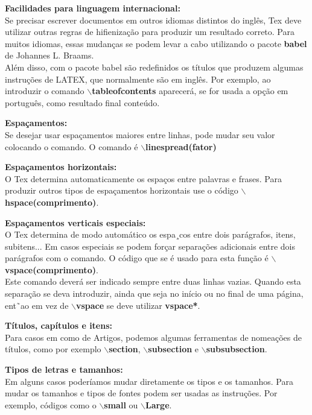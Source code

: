 \documentclass[a4paper, 12pt]{article}
\begin{document}
\begin{flushleft}
\textbf{Facilidades para linguagem internacional:}
\\
Se precisar escrever documentos em outros idiomas distintos do inglês, Tex deve utilizar outras regras de hifienização para produzir um resultado correto. Para muitos idiomas, essas mudanças se podem levar a cabo utilizando o pacote \textbf{babel} de Johannes L. Braams. 
\\
Além disso, com o pacote babel são redefinidos os títulos que produzem algumas instruções de LATEX, que normalmente são em inglês. Por exemplo, ao introduzir o comando \textbf{$\backslash$tableofcontents} aparecerá, se for usada a opção em português, como resultado final conteúdo. \singlespacing

\textbf{Espaçamentos:}
\\
Se desejar usar espaçamentos maiores entre linhas, pode mudar seu valor colocando o comando. O comando é \textbf{$\backslash$linespread(fator)} \singlespacing

\textbf{Espaçamentos horizontais:}
\\
O Tex determina automaticamente os espaços entre palavras e frases. Para produzir outros tipos de espaçamentos horizontais use o código \textbf{$\backslash$hspace(comprimento)}. \singlespacing

\textbf{Espaçamentos verticais especiais:}
\\
O Tex determina de modo automático os espa¸cos entre dois parágrafos, itens, subitens... Em casos especiais se podem forçar separações adicionais entre dois parágrafos com o comando. O código que se é usado para esta função é \textbf{$\backslash$vspace(comprimento)}.
\\
Este comando deverá ser indicado sempre entre duas linhas vazias. Quando esta separação se deva introduzir, ainda que seja no início ou no final de uma página, ent˜ao em vez de \textbf{$\backslash$vspace} se deve utilizar \textbf{vspace*}. \singlespacing

\textbf{Títulos, capítulos e itens:}
\\
Para casos em como de Artigos, podemos algumas ferramentas de nomeações de títulos, como por exemplo \textbf{$\backslash$section}, \textbf{$\backslash$subsection} e \textbf{$\backslash$subsubsection}. \singlespacing

\textbf{Tipos de letras e tamanhos:}
\\
Em alguns casos poderíamos mudar diretamente os tipos e os tamanhos. Para mudar os tamanhos e tipos de fontes podem ser usadas as instruções. Por exemplo, códigos como o \textbf{$\backslash$small} ou \textbf{$\backslash$Large}. \singlespacing


\end{flushleft}
\end{document}
